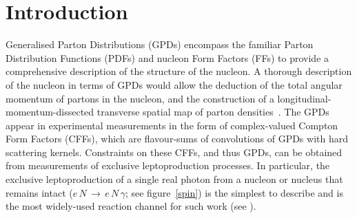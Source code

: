 \documentclass[11pt,a4paper]{article}
\begin{document}
\setvruler[15pt][1][1][3][1][30pt][30pt][-42pt]
\maketitle
\section{Introduction}
Generalised Parton Distributions (GPDs)
\cite{Mue94,Ji97,Rad97} encompass the familiar Parton
Distribution Functions (PDFs) and nucleon Form Factors (FFs) to provide a
comprehensive description of the structure of the nucleon. A thorough
description of the nucleon in terms of GPDs would allow the deduction
of the total angular momentum of partons in the nucleon, and the
construction of a longitudinal-momentum-dissected transverse spatial map of parton densities~\cite{Bur00}. The GPDs appear in experimental measurements in the form of complex-valued Compton Form Factors (CFFs), which are flavour-sums of convolutions of GPDs with hard scattering kernels. Constraints on these CFFs, and thus GPDs, can be obtained from measurements of exclusive leptoproduction processes. In particular, the exclusive leptoproduction of a single real photon from a nucleon or nucleus that remains intact ($e\,N\,\rightarrow\,e\,N\,\gamma$; see figure~\ref{spin}) is the simplest to describe and is the most widely-used reaction channel for such work (see \cite{Air01,Air06,Air08,Air09,Air10,Air10a,Air10b,Air11,Air11a,h101,h105,h107,h109,zeu03,zeu08,Maz07,Cam06,Ste01,Che06,Gir08,Gav09,Com10}).
\end{document}
